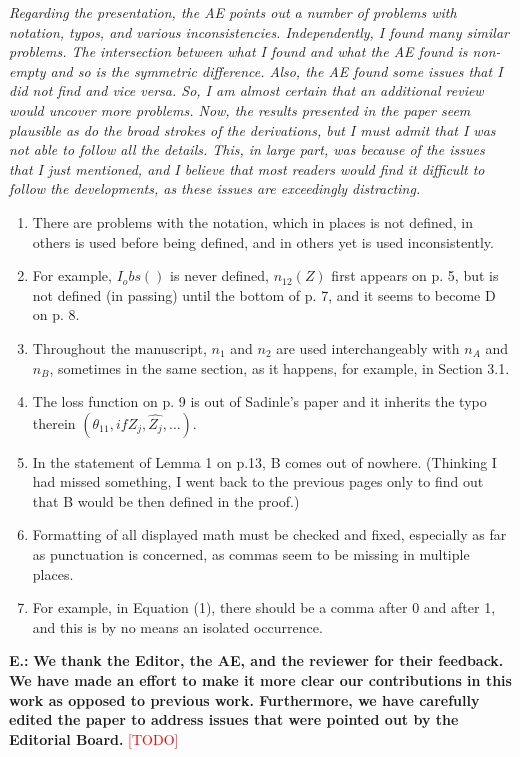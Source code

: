 \documentclass[letterpaper, parskip]{scrartcl}
\newcommand{\pointRaised}[1]{%
	\begin{tcolorbox}
		\itshape #1
	\end{tcolorbox}
}
\newcounter{responsectr}[section]     %
\newcommand{\reply}[2]{%
	\refstepcounter{responsectr}%
	\textbf{#1.\theresponsectr:} #2
}
\newcommand{\todo}{\textcolor{red}{[TODO]}\xspace}
\begin{document}
	\pointRaised{%
	Regarding the presentation, the AE points out a number of problems with notation, typos, and various inconsistencies.  Independently, I found many similar problems.  The intersection between what I found and what the AE found is non-empty and so is the symmetric difference.  Also, the AE found some issues that I did not find and vice versa.  So, I am almost certain that an additional review would uncover more problems.  Now, the results presented in the paper seem plausible as do the broad strokes of the derivations, but I must admit that I was not able to follow all the details. This, in large part, was because of the issues that I just mentioned, and I believe that most readers would find it difficult to follow the developments, as these issues are exceedingly distracting.
	
	\begin{enumerate}
	\item There are problems with the notation, which in places is not defined, in others is used before being defined, and in others yet is used inconsistently.  
	\item For example, $I_obs()$ is never defined, $n_12(Z)$ first appears on p. 5, but is not defined (in passing) until the bottom of p. 7, and it seems to become D on p. 8.  
	\item Throughout the manuscript, $n_1$ and $n_2$ are used interchangeably with $n_A$ and $n_B$, sometimes in the same section, as it happens, for example, in Section 3.1.  
	\item The loss function on p. 9 is out of Sadinle’s paper and it inherits the typo therein $(\theta_11, if Z_j, \hat{Z_j}, …)$. 
	\item  In the statement of Lemma 1 on p.13, B comes out of nowhere.  (Thinking I had missed something, I went back to the previous pages only to find out that B would be then defined in the proof.)  
	\item Formatting of all displayed math must be checked and fixed, especially as far as punctuation is concerned, as commas seem to be missing in multiple places.  
	\item For example, in Equation (1), there should be a comma after 0 and after 1, and this is by no means an isolated occurrence.
	\end{enumerate}
	}
	
		\reply{E}{%
	\textbf{We thank the Editor, the AE, and the reviewer for their feedback. We have made an effort to make it more clear our contributions in this work as opposed to previous work. Furthermore, we have carefully edited the paper to address issues that were pointed out by the Editorial Board.} \todo
	}
	
\end{document}
